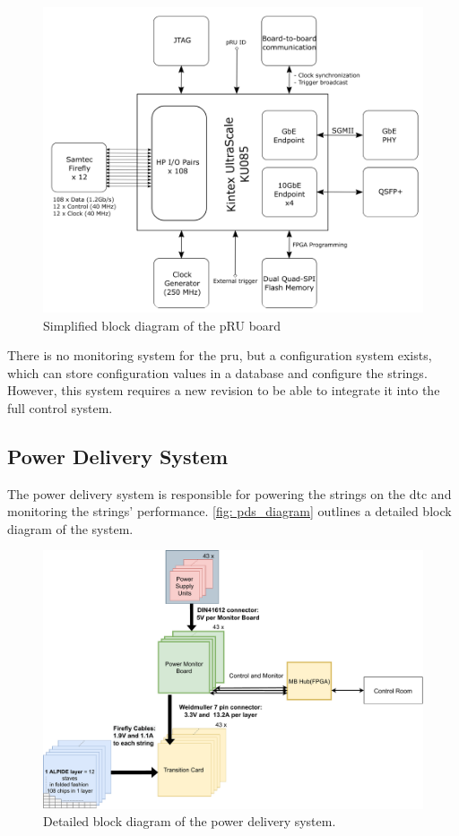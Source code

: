 \documentclass[main.tex]{subfiles}
\begin{document}
\begin{figure}[!ht]
    \centering
    \includegraphics[scale=0.5]{images/pru_diagram.png}
    \caption{Simplified block diagram of the pRU board\cite{ola}}
    \label{fig: pru_diagram}
\end{figure}
\FloatBarrier

There is no monitoring system for the \gls{pru}, but a configuration system exists, which can store configuration values in a database and configure the strings. However, this system requires a new revision to be able to integrate it into the full control system.

\subsection{Power Delivery System}

The power delivery system is responsible for powering the strings on the \gls{dtc} and monitoring the strings' performance. \autoref{fig: pds_diagram} outlines a detailed block diagram of the system.

\begin{figure}[!ht]
    \centering
    \includegraphics[scale=0.5]{images/pds_detail.pdf}
    \caption{Detailed block diagram of the power delivery system.}
    \label{fig: pds_diagram}
\end{figure}
\FloatBarrier
\end{document}
